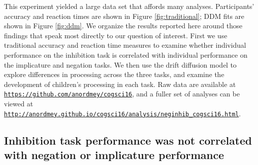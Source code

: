 \documentclass[man, noapacite]{apa2}
\begin{document}
This experiment yielded a large data set that affords many analyses.  Participants' accuracy and reaction times are shown in Figure \ref{fig:traditional}; DDM fits are shown in Figure \ref{fig:ddm}. We organize the results reported here around those findings that speak most directly to our question of interest.  First we use traditional accuracy and reaction time measures to examine whether individual performance on the inhibition task is correlated with individual performance on the implicature and negation tasks. We then use the drift diffusion model to explore differences in processing across the three tasks, and examine the development of children's processing in each task.  Raw data are available at \href{https://github.com/anordmey/cogsci16}{\nolinkurl{https://github.com/anordmey/cogsci16}}, and a fuller set of analyses can be viewed at \href{http://anordmey.github.io/cogsci16/analysis/neginhib_cogsci16.html}{\nolinkurl{http://anordmey.github.io/cogsci16/analysis/neginhib_cogsci16.html}}.


\subsection{Inhibition task performance was not correlated with negation or implicature performance}

\end{document}
